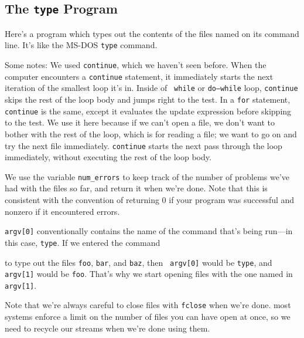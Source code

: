 \subsection{The {\tt type} Program}

Here's a program which types out the contents of the files named on its
command line.  It's like the MS-DOS {\tt type} command.

\label{type-program}



\label{continue}
Some notes: We used {\tt continue}, which we haven't seen before.  When
the computer encounters a {\tt continue} statement, it immediately
starts the next iteration of the smallest loop it's in.  Inside of {\tt
while} or {\tt do{\rm--}while} loop, {\tt continue} skips the rest of
the loop body and jumps right to the test.  In a {\tt for} statement,
{\tt continue} is the same, except it evaluates the update expression
before skipping to the test.  We use it here because if we can't open a
file, we don't want to bother with the rest of the loop, which is for
reading a file; we want to go on and try the next file immediately.
{\tt continue} starts the next pass through the loop immediately,
without executing the rest of the loop body.

We use the variable {\tt num\_errors} to keep track of the number of
problems we've had with the files so far, and return it when we're done.
Note that this is consistent with the convention of returning 0 if your
program was successful and nonzero if it encountered errors.  

{\tt argv[0]} conventionally contains the name of the command
that's being run---in this case, {\tt type}.  If we entered the command 
\begin{flushleft}
\verb% type foo bar baz% \\*
\end{flushleft}

\noindent to type out the files {\tt foo}, {\tt bar}, and {\tt baz}, then {\tt
argv[0]} would be {\tt type}, and {\tt argv[1]} would be {\tt foo}.
That's why we start opening files with the one named in {\tt argv[1]}.

Note that we're always careful to close files with {\tt fclose} when
we're done.  most systems enforce a limit on the number of files you can
have open at once, so we need to recycle our streams when we're done
using them.  
